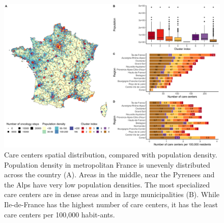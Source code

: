 \begin{figure}[h]
    \includegraphics[width=\textwidth]{images/camion/supplemental/sup_fig4_care_centers_pop_density.png}
    \centering
    \caption{
        Care centers spatial distribution, compared with population density. Population density in metropolitan France is unevenly distributed across the country (A). Areas in the middle, near the Pyrenees and the Alps have very low population densities. The most specialized care centers are in dense areas and in large municipalities (B). While Ile-de-France has the highest number of care centers, it has the least care centers per 100,000 habit-ants.
    }
    \label{fig:clustering-map}
\end{figure}

